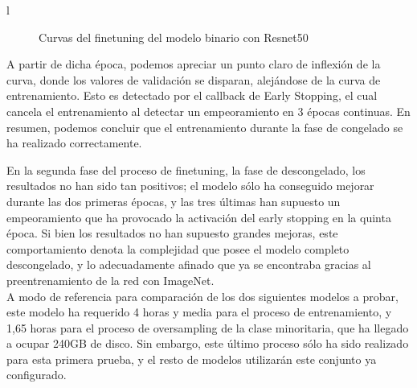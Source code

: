 l\begin{figure}[H]
	\centering
	\caption{Curvas del finetuning del modelo binario con Resnet50}
	\label{fig:curvasrensetbinaria}
	
\end{figure}

A partir de dicha época, podemos apreciar un punto claro de inflexión de la curva, donde los valores de validación se disparan, alejándose de la curva de entrenamiento. Esto es detectado por el callback de Early Stopping, el cual cancela el entrenamiento al detectar un empeoramiento en 3 épocas continuas. En resumen, podemos concluir que el entrenamiento durante la fase de congelado se ha realizado correctamente.

En la segunda fase del proceso de finetuning, la fase de descongelado, los resultados no han sido tan positivos; el modelo sólo ha conseguido mejorar durante las dos primeras épocas, y las tres últimas han supuesto un empeoramiento que ha provocado la activación del early stopping en la quinta época. Si bien los resultados no han supuesto grandes mejoras, este comportamiento denota la complejidad que posee el modelo completo descongelado, y lo adecuadamente afinado que ya se encontraba gracias al preentrenamiento de la red con ImageNet.\\

A modo de referencia para comparación de los dos siguientes modelos a probar, este modelo ha requerido 4 horas y media para el proceso de entrenamiento, y 1,65 horas para el proceso de oversampling de la clase minoritaria, que ha llegado a ocupar 240GB de disco. Sin embargo, este último proceso sólo ha sido realizado para esta primera prueba, y el resto de modelos utilizarán este conjunto ya configurado.\\

